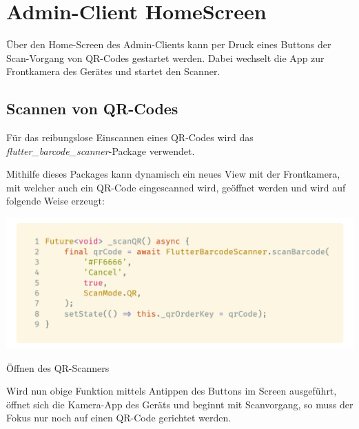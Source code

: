 \section{Admin-Client HomeScreen}

Über den Home-Screen des Admin-Clients kann per Druck eines Buttons der Scan-Vorgang
von QR-Codes gestartet werden. Dabei wechselt die App zur Frontkamera des Gerätes und startet den Scanner.

\subsection{Scannen von QR-Codes}

Für das reibungslose Einscannen eines QR-Codes wird das \textit{flutter\_barcode\_scanner}-Package
verwendet.\cite{flutterBarcodeScanner2021}

Mithilfe dieses Packages kann dynamisch ein neues View mit der Frontkamera, mit welcher auch 
ein QR-Code eingescanned wird, geöffnet werden und wird auf folgende Weise erzeugt:

\begin{code}[H]
    \centering
    \includegraphics[width=1\textwidth]{images/Admin-Client/screens/scanQR.png}
    \vspace{-25pt}
    \caption{Öffnen des QR-Scanners}
\end{code}

Wird nun obige Funktion mittels Antippen des Buttons im Screen ausgeführt, öffnet sich die 
Kamera-App des Geräts und beginnt mit Scanvorgang, so muss der Fokus nur noch auf einen 
QR-Code gerichtet werden.

